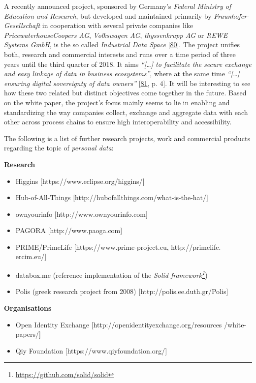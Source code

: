 \documentclass[12pt,english,a4paper,titlepage,cleardoublepage=empty,dottedtoc]{report}
\renewcommand{\href}[2]{#2\footnote{\url{#1}}}
\providecommand{\tightlist}{%
  \setlength{\itemsep}{0pt}\setlength{\parskip}{0pt}}
\begin{document}
A recently announced project, sponsored by Germany's \emph{Federal
Ministry of Education and Research}, but developed and maintained
primarily by \emph{Fraunhofer-Gesellschaft} in cooperation with several
private companies like \emph{PricewaterhouseCoopers AG},
\emph{Volkswagen AG}, \emph{thyssenkrupp AG} or \emph{REWE Systems
GmbH}, is the so called \emph{Industrial Data Space}
{[}\protect\hyperlink{ref-web_industrial-data-space}{80}{]}. The project
unifies both, research and commercial interests and runs over a time
period of three years until the third quarter of 2018. It aims
\emph{``{[}\ldots{}{]} to facilitate the secure exchange and easy
linkage of data in business ecosystems''}, where at the same time
\emph{``{[}\ldots{}{]} ensuring digital sovereignty of data owners''}
{[}\protect\hyperlink{ref-whitepaper_2016_industrial-data-space}{81}, p.
4{]}. It will be interesting to see how these two related but distinct
objectives come together in the future. Based on the white paper, the
project's focus mainly seems to lie in enabling and standardizing the
way companies collect, exchange and aggregate data with each other
across process chains to ensure high interoperability and accessibility.

The following is a list of further research projects, work and
commercial products regarding the topic of \emph{personal data}:

\textbf{Research}

\begin{itemize}
\tightlist
\item
  Higgins {[}https://www.eclipse.org/higgins/{]}
\item
  Hub-of-All-Things {[}http://hubofallthings.com/what-is-the-hat/{]}
\item
  ownyourinfo {[}http://www.ownyourinfo.com{]}
\item
  PAGORA {[}http://www.paoga.com{]}
\item
  PRIME/PrimeLife {[}https://www.prime-project.eu, http://primelife.
  ercim.eu/{]}
\item
  databox.me (reference implementation of the
  \emph{\href{https://github.com/solid/solid}{Solid framework}})
\item
  Polis (greek research project from 2008)
  {[}http://polis.ee.duth.gr/Polis{]}
\end{itemize}

\textbf{Organisations}

\begin{itemize}
\tightlist
\item
  Open Identity Exchange {[}http://openidentityexchange.org/resources
  /white-papers/{]}
\item
  Qiy Foundation {[}https://www.qiyfoundation.org/{]}
\end{itemize}
\end{document}
